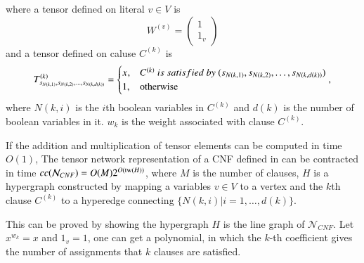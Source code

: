 \documentclass[review, onefignum, onetabnum]{siamart190516}
\begin{document}
where a tensor defined on literal $v \in V$ is
\begin{equation}
    W^{(v)} = \left(\begin{matrix}
    1\\
    1_v
    \end{matrix}\right)
\end{equation}
and a tensor defined on caluse $C^{(k)}$ is
\begin{equation}
T^{(k)}_{s_{N(k, 1)}, s_{N(k, 2)}, \ldots, s_{N(k, d(k))}} = \begin{cases}
    x^{}, &C^{(k)} ~is~ satisfied ~by~ (s_{N(k, 1)}, s_{N(k, 2)}, \ldots, s_{N(k, d(k))})\\
    1, &{\rm otherwise}
\end{cases},
\end{equation}
where $N(k, i)$ is the $i$th boolean variables in $C^{(k)}$ and $d(k)$ is the number of boolean variables in it.
$w_k$ is the weight associated with clause $C^{(k)}$.
\begin{theorem}\label{thm:cnfcomplex}
    If the addition and multiplication of tensor elements can be computed in time $O(1)$,
    The tensor network representation of a CNF defined in  can be contracted in time $cc(\mathcal{N}_{CNF}) = O(M)2^{O({\rm tw}(H))}$, where $M$ is the number of clauses,
    $H$ is a hypergraph constructed by mapping a variables $v\in V$ to a vertex and the $k$th clause $C^{(k)}$ to a hyperedge connecting $\{N(k, i)|i=1,\ldots, d(k)\}$.
\end{theorem}
This can be proved by showing the hypergraph $H$ is the line graph of $\mathcal{N}_{CNF}$.
Let $x^{w_k} = x$ and $1_v = 1$, one can get a polynomial, in which the $k$-th coefficient gives the number of assignments that $k$ clauses are satisfied.
\end{document}
